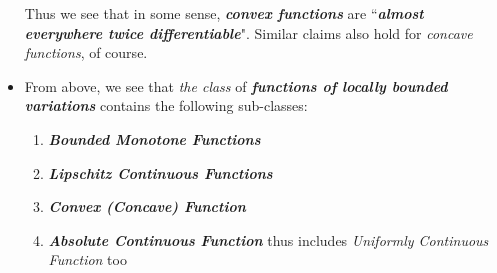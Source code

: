 \documentclass[11pt]{article}
\begin{document}
\begin{itemize}
\begin{remark}
Thus we see that in some sense, \emph{\textbf{convex functions}} are ``\emph{\textbf{almost everywhere twice differentiable}}". Similar claims also hold
for \emph{concave functions}, of course.
\end{remark}

\item \begin{remark}
From above, we see that \emph{the class} of \emph{\textbf{functions of locally bounded variations}} contains the following sub-classes:
\begin{enumerate}
\item \emph{\textbf{Bounded Monotone Functions}}
\item \emph{\textbf{Lipschitz Continuous Functions}}
\item \emph{\textbf{Convex (Concave) Function}}
\item \emph{\textbf{Absolute Continuous Function}} thus includes \emph{Uniformly Continuous Function} too
\end{enumerate}
\end{remark}
\end{itemize}
\end{document}
